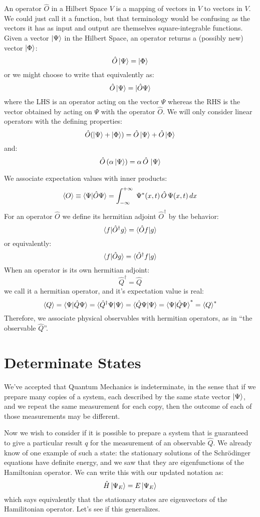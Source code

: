 \documentclass[12pt]{book}
\begin{document}
An operator $\hat{O}$ in a Hilbert Space $V$ is a mapping of vectors in $V$ to vectors in $V$.  We could just call it a function, but that terminology would be confusing as the vectors it has as input and output are themselves square-integrable functions.  Given a vector $\ket{\Psi}$ in the Hilbert Space, an operator returns a (possibly new) vector $\ket{\Phi}$:
$$\hat{O}\ket{\Psi} = \ket{\Phi}$$ 
or we might choose to write that equivalently as:
$$\hat{O}\ket{\Psi} = \ket{\hat{O} \Psi}$$ 
where the LHS is an operator acting on the vector $\Psi$ whereas the RHS is the vector obtained by acting on $\Psi$ with the operator $\hat{O}$.  We will only consider linear operators with the defining properties:
$$\hat{O}(\ket{\Psi}+\ket{\Phi}) = \hat{O}\ket{\Psi}+\hat{O}\ket{\Phi}$$
and:
$$\hat{O}\,(\alpha\ket{\Psi}) = \alpha \,\hat{O}\,\ket{\Psi}$$

We associate expectation values with inner products:
$$\braket{O} \equiv \braket{\Psi|\hat{O}\Psi} = \int_{-\infty}^{+\infty}\; \Psi^*(x,t) \, \hat{O} \, \Psi(x,t) \, dx$$
For an operator $\hat{O}$ we define its hermitian adjoint $\hat{O}^\dagger$ by the behavior:
$$\braket{f|\hat{O}^\dagger g} = \braket{\hat{O} f| g}$$
or equivalently:
$$\braket{f|\hat{O} g} = \braket{\hat{O}^\dagger f| g}$$
When an operator is its own hermitian adjoint:
$$\hat{Q}^\dagger = \hat{Q}$$
we call it a hermitian operator, and it's expectation value is real:
$$\braket{Q} = \braket{\Psi|\hat{Q}\Psi} = \braket{\hat{Q}^\dagger \Psi|\Psi}=\braket{\hat{Q}\Psi|\Psi}=\braket{\Psi|\hat{Q}\Psi}^* = \braket{Q}^*$$
Therefore, we associate physical observables with hermitian operators, as in ``the observable $\hat{Q}$''.


\section{Determinate States}

We've accepted that Quantum Mechanics is indeterminate, in the sense
that if we prepare many copies of a system, each described by the same
state vector $\ket{\Psi}$, and we repeat the same measurement for each
copy, then the outcome of each of those measurements may be different.

Now we wish to consider if it is possible to prepare a system that is
guaranteed to give a particular result $q$ for the measurement of an observable $\hat{Q}$.  We already know of one example of such a state:  the stationary solutions of the Schr\"odinger equations have definite energy, and we saw that they are eigenfunctions of the Hamiltonian operator.  We can write this with our updated notation as:
$$\hat{H} \ket{\Psi_E} = E \ket{\Psi_E}$$
which says equivalently that the stationary states are eigenvectors of the Hamilitonian operator.  Let's see if this generalizes.
\end{document}
